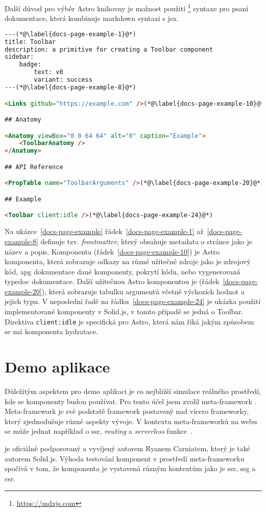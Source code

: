 Další důvod pro výběr Astro knihovny je možnost použití \footnote{\url{https://mdxjs.com}} syntaxe pro psaní dokumentace, která kombinuje markdown syntaxi s \gls{jsx}.

\begin{lstlisting}[caption={Ukázka stránky dokumentace psané v MDX}, label={docs-page-example}, language=html]
---(*@\label{docs-page-example-1}@*)
title: Toolbar
description: a primitive for creating a Toolbar component
sidebar:
    badge:
        text: v0
        variant: success
---(*@\label{docs-page-example-8}@*)

<Links github="https://example.com" />(*@\label{docs-page-example-10}@*)

## Anatomy

<Anatomy viewBox="0 0 64 64" alt="0" caption="Example">
    <ToolbarAnatomy />
</Anatomy>

## API Reference

<PropTable name="ToolbarArguments" />(*@\label{docs-page-example-20}@*)

## Example

<Toolbar client:idle />(*@\label{docs-page-example-24}@*)
\end{lstlisting}

Na ukázce~\ref{docs-page-example} řádek~\ref{docs-page-example-1} až~\ref{docs-page-example-8} definuje tzv. \textit{frontmatter}, který obsahuje metadata o stránce jako je název a popis.
Komponenta  (řádek~\ref{docs-page-example-10}) je Astro komponenta, která zobrazuje odkazy na různé užitečné zdroje jako je zdrojový kód, \gls{apg} dokumentace dané komponenty, pokrytí kódu, nebo vygenerovaná typedoc dokumentace.
Další užitečnou Astro komponentou je  (řádek~\ref{docs-page-example-20}), která zobrazuje tabulku argumentů včetně výchozích hodnot a jejich typu.
V neposlední řadě na řádku~\ref{docs-page-example-24} je ukázka použití implementované komponenty v Solid.js, v tomto případě se jedná o Toolbar.
Direktiva \texttt{client:idle} je specifická pro Astro, která nám říká jakým způsobem se má komponenta \gls{hydratace}.

\section{Demo aplikace}

Důležitým aspektem pro demo aplikaci je co nejbližší simulace reálného prostředí, kde se komponenty budou používat.
Pro tento účel jsem zvolil meta-framework . Meta-framework je své podstatě framework postavený nad vícero frameworky, který zjednodušuje různé aspekty vývoje.
V kontextu meta-frameworků na webu se může jednat například o \gls{ssr}, \textit{routing} a \textit{serverless} funkce~\cite{prismic-metaframework}.

 je oficiálně podporovaný a vyvíjený autorem Ryanem Carniatem, který je také autorem Solid.js.
Výhoda testování komponent v prostředí meta-frameworku spočívá v tom, že komponenta je vystavená různým kontextům jako je \gls{ssr}, \gls{ssg} a \gls{csr}.

